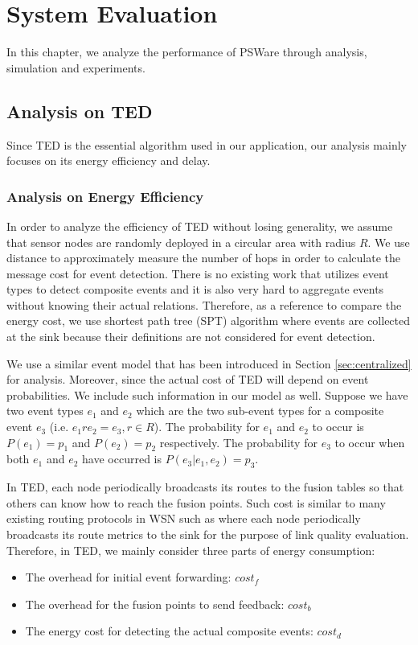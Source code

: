 \chapter{System Evaluation}
\label{chapter:evaluation}
In this chapter, we analyze the performance of PSWare through analysis, simulation and experiments.

\section{Analysis on TED}
\label{sec:ceduanalysis}
Since TED is the essential algorithm used in our application, our analysis mainly focuses on its energy efficiency and delay.

\subsection{Analysis on Energy Efficiency}
In order to analyze the efficiency of TED without losing generality, we assume that sensor nodes are randomly deployed in a circular area with radius \(R\). We use distance to approximately measure the number of hops in order to calculate the message cost for event detection. There is no existing work that utilizes event types to detect composite events and it is also very hard to aggregate events without knowing their actual relations. Therefore, as a reference to compare the energy cost, we use shortest path tree (SPT) algorithm where events are collected at the sink because their definitions are not considered for event detection.


We use a similar event model that has been introduced in Section \ref{sec:centralized} for analysis. Moreover, since the actual cost of TED will depend on event probabilities. We include such information in our model as well. Suppose we have two event types \(e_1\) and \(e_2\) which are the two sub-event types for a composite event \(e_3\) (i.e. \(e_1re_2=e_3, r\in R\)). The probability for \(e_1\) and \(e_2\) to occur is \(P(e_1)=p_1\) and \(P(e_2)=p_2\) respectively. The probability for \(e_3\) to occur when both \(e_1\) and \(e_2\) have occurred is \(P(e_3|e_1, e_2)=p_3\).

In TED, each node periodically broadcasts its routes to the fusion tables so that others can know how to reach the fusion points. Such cost is similar to many existing routing protocols in WSN such as \cite{rssiroute} where each node periodically broadcasts its route metrics to the sink for the purpose of link quality evaluation. Therefore, in TED, we mainly consider three parts of energy consumption:
\begin{itemize}
\item The overhead for initial event forwarding: \(cost_f\)
\item The overhead for the fusion points to send feedback: \(cost_b\)
\item The energy cost for detecting the actual composite events: \(cost_d\)
\end{itemize}

